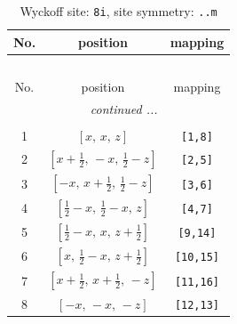\documentclass[fleqn,8pt]{jsarticle}
\begin{document}
\begin{longtable}{ccc}
\caption{Wyckoff site: {\tt 8i}, site symmetry: {\tt ..m}}
 \\
 \hline \hline
No. & position & mapping \\ \hline \endfirsthead

\multicolumn{2}{l}{\tablename\ \thetable{}} \\
 \hline \hline
No. & position & mapping \\ \hline \endhead

 \hline \hline
\multicolumn{2}{r}{\footnotesize\it continued ...} \\ \endfoot

 \hline \hline
\multicolumn{2}{r}{} \\ \endlastfoot

1 & $\left[ x,\, x,\, z \right]$ & {\tt [1,8]} \\ \hline
2 & $\left[ x + \frac{1}{2},\, - x,\, \frac{1}{2} - z \right]$ & {\tt [2,5]} \\ \hline
3 & $\left[ - x,\, x + \frac{1}{2},\, \frac{1}{2} - z \right]$ & {\tt [3,6]} \\ \hline
4 & $\left[ \frac{1}{2} - x,\, \frac{1}{2} - x,\, z \right]$ & {\tt [4,7]} \\ \hline
5 & $\left[ \frac{1}{2} - x,\, x,\, z + \frac{1}{2} \right]$ & {\tt [9,14]} \\ \hline
6 & $\left[ x,\, \frac{1}{2} - x,\, z + \frac{1}{2} \right]$ & {\tt [10,15]} \\ \hline
7 & $\left[ x + \frac{1}{2},\, x + \frac{1}{2},\, - z \right]$ & {\tt [11,16]} \\ \hline
8 & $\left[ - x,\, - x,\, - z \right]$ & {\tt [12,13]} \\
\end{longtable}
\renewcommand{\arraystretch}{1.2}
\end{document}
